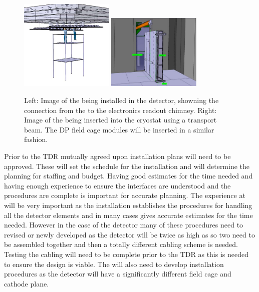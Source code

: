 \begin{figure}[htbp]
\begin{center}
\includegraphics[width=0.4\textwidth]{far-detector-single-phase/figures/CRP-install.pdf}
\includegraphics[width=0.4\textwidth]{far-detector-single-phase/figures/CRP-into-cryostat.pdf}
\caption{Left: Image of the   being installed in
  the detector, showning the connection from the  to the
  electronics readout chimney. Right: Image of the  being
  inserted into the cryostat using a transport beam.  The DP field
  cage modules will be inserted in a similar fashion.}
\label{fig:CRP-Install}
\end{center}
\end{figure}



Prior to the TDR mutually agreed upon installation plans will need to
be approved. These will set the schedule for the installation and will
determine the planning for staffing and budget. Having good estimates
for the time needed and having enough experience to ensure the
interfaces are understood and the procedures are complete is important
for accurate planning. The experience at  will be
very important as the  installation establishes the
procedures for handling all the detector elements and in many cases
gives accurate estimates for the time needed. However in the case of
the  detector many of these procedures need to revised or
newly developed as the  detector will be twice as high as
 so two  need to be assembled together
and then a totally different cabling scheme is needed. Testing the
cabling will need to be complete prior to the TDR as this is needed to
ensure the design is viable. The  will also need to develop
installation procedures as the   detector
will have a significantly different field cage and cathode plane. 

